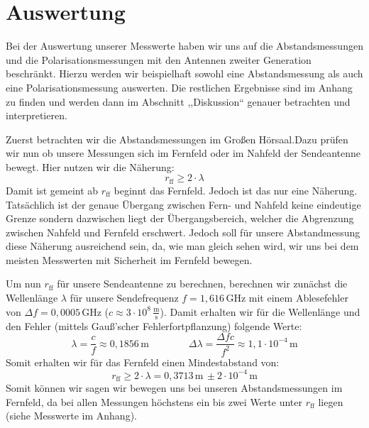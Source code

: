 \documentclass[titlepage,11pt,a4paper,ngerman]{article}
\newcommand{\tx}[1]{\textrm{#1}}
\begin{document}
\section{Auswertung}
Bei der Auswertung unserer Messwerte haben wir uns auf die Abstandsmessungen und die Polarisationsmessungen mit den Antennen zweiter Generation beschränkt. Hierzu werden wir beispielhaft sowohl eine Abstandsmessung als auch eine Polarisationsmessung auswerten. Die restlichen Ergebnisse sind im Anhang zu finden und werden dann im Abschnitt  ,,Diskussion`` genauer betrachten und interpretieren. \par 
Zuerst betrachten wir die Abstandsmessungen im Großen Hörsaal.Dazu prüfen wir nun ob unsere Messungen sich im Fernfeld oder im Nahfeld \cite{NahfeldundFernfeld} der Sendeantenne bewegt. Hier nutzen wir die Näherung:
\begin{equation}
r_{\tx{ff}} \geqslant 2\cdot\lambda
\label{rff}
\end{equation}
Damit ist gemeint ab $r_{\tx{ff}}$ beginnt das Fernfeld. Jedoch ist das nur eine Näherung. Tatsächlich ist der genaue Übergang zwischen Fern- und Nahfeld keine eindeutige Grenze sondern dazwischen liegt der Übergangsbereich, welcher die Abgrenzung zwischen Nahfeld und Fernfeld erschwert. Jedoch soll für unsere Abstandmessung diese Näherung ausreichend sein, da, wie man gleich sehen wird, wir uns bei dem meisten Messwerten mit Sicherheit im Fernfeld bewegen. \par 
Um nun $r_{\tx{ff}}$ für unsere Sendeantenne zu berechnen, berechnen wir zunächst die Wellenlänge $\lambda$ für unsere Sendefrequenz $f=1{,}616\,$GHz mit einem Ablesefehler von $\Delta f=0{,}0005\,$GHz ($c\approx 3\cdot10^{8}\,\frac{\tx{m}}{\tx{s}}$). Damit erhalten wir für die Wellenlänge und den Fehler (mittels Gauß'scher Fehlerfortpflanzung) folgende Werte:
\begin{equation*}
\lambda = \frac{c}{f} \approx 0{,}1856\,\tx{m} \qquad \qquad
\Delta \lambda = \frac{\Delta f c}{f^{2}} \approx 1{,}1 \cdot 10^{-4}\,\tx{m}
\end{equation*}
Somit erhalten wir für das Fernfeld einen Mindestabstand von: 
\begin{equation*}
r_{\tx{ff}} \geqslant 2\cdot\lambda = 0{,}3713\,\tx{m}\, \pm 2\cdot10^{-4}\,\tx{m}
\end{equation*}
Somit können wir sagen wir bewegen uns bei unseren Abstandsmessungen im Fernfeld, da bei allen Messungen höchstens ein bis zwei Werte unter $r_{\tx{ff}}$ liegen (siehe Messwerte im Anhang). \par 
\end{document}
